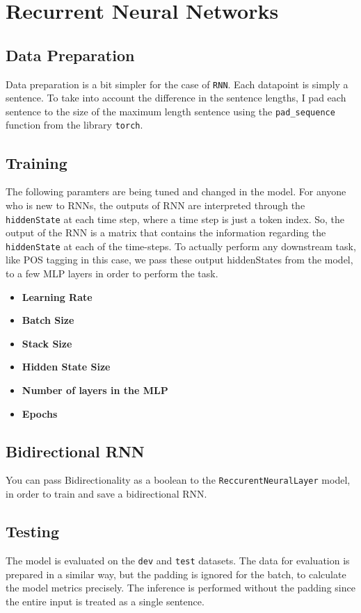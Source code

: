 \section*{Recurrent Neural Networks}

\subsection*{Data Preparation}
Data preparation is a bit simpler for the case of \verb|RNN|. Each datapoint is simply a sentence. To take into account the difference in the sentence lengths, I pad each sentence to the size of the maximum length sentence using the \verb|pad_sequence| function from the library \verb|torch|.

\subsection*{Training}
The following paramters are being tuned and changed in the model. For anyone who is new to RNNs, the outputs of RNN are interpreted through the \verb|hiddenState| at each time step, where a time step is just a token index. So, the output of the RNN is a matrix that contains the information regarding the \verb|hiddenState| at each of the time-steps. To actually perform any downstream task, like POS tagging in this case, we pass these output hiddenStates from the model, to a few MLP layers in order to perform the task.

\begin{itemize}
    \item \textbf{Learning Rate}
    \item \textbf{Batch Size}
    \item \textbf{Stack Size}
    \item \textbf{Hidden State Size}
    \item \textbf{Number of layers in the MLP}
    \item \textbf{Epochs}
\end{itemize}

\subsection*{Bidirectional RNN}
You can pass Bidirectionality as a boolean to the \verb|ReccurentNeuralLayer| model, in order to train and save a bidirectional RNN.

\subsection*{Testing}
The model is evaluated on the \verb|dev| and \verb|test| datasets. The data for evaluation is prepared in a similar way, but the padding is ignored for the batch, to calculate the model metrics precisely. The inference is performed without the padding since the entire input is treated as a single sentence.
